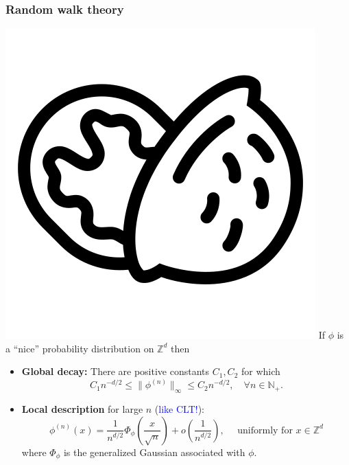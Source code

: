 \documentclass{beamer}
\theoremstyle{definition}
\newcommand{\lp}{\left(}
\newcommand{\rp}{\right)}
\begin{document}
\begin{frame}
\frametitle{Random walk theory}
\includegraphics[scale=0.025]{nutshell} If $\phi$ is a ``nice'' probability distribution on $\mathbb{Z}^d$ then\\


\pause 


\begin{itemize}
	\item \textbf{Global decay:} There are positive constants $C_1, C_2$ for which 
	\begin{equation*}
	C_1 n^{-d/2} \leq \| \phi^{(n)} \|_\infty \leq C_2n^{-d/2}, \quad \forall n\in \mathbb{N}_+.
	\end{equation*}
	
	
	
	\pause
	\item \textbf{Local description} for large $n$ (\textcolor{blue}{like CLT!}):
	\begin{equation*}
	\phi^{(n)}(x) = \frac{1}{n^{d/2}} \Phi_\phi \lp \frac{x}{\sqrt{n}} \rp + o\lp \frac{1}{n^{d/2}} \rp, \quad \text{	uniformly for } x\in \mathbb{Z}^d
	\end{equation*}
	where $\Phi_\phi$ is the generalized Gaussian associated with $\phi$. 
	
	
%	
\end{itemize}
\end{frame}
\end{document}
